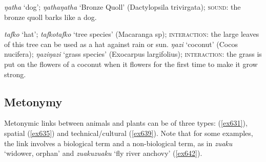 	\begin{exe}
		\ex \label{ex645} \emph{ŋatha} `dog'; \emph{ŋathaŋatha} `Bronze Quoll' (Dactylopsila trivirgata); \textsc{sound:} the bronze quoll barks like a dog.
	\end{exe}%
	\begin{exe}
	\ex \label{ex628}
	\begin{xlist}
		\ex \label{ex629} \emph{tafko} `hat'; \emph{tafkotafko} `tree species' (Macaranga sp); \textsc{interaction:} the large leaves of this tree can be used as a hat against rain or sun.
		\ex \label{ex630} \emph{ŋazi} `coconut' (Cocos nucifera); \emph{ŋaziŋazi} `grass species' (Exocarpus largifolius); \textsc{interaction:} the grass is put on the flowers of a coconut when it flowers for the first time to make it grow strong.
	\end{xlist}
\end{exe}%
\fussy 

\subsection{Metonymy}\label{redupmetonymy}

Metonymic links between animals and plants can be of three types:  (\ref{ex631}), spatial (\ref{ex635}) and technical/cultural (\ref{ex639}). Note that for some examples, the link involves a biological term and a non-biological term, as in \emph{zuaku} `widower, orphan' and \emph{zuakuzuaku} `fly river anchovy' (\ref{ex642}).

